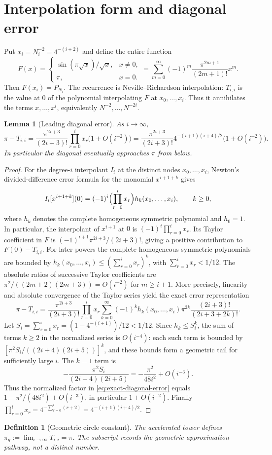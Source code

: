 \documentclass[11pt]{article}
\newtheorem{lemma}{Lemma}
\newtheorem{definition}{Definition}
\begin{document}
\section{Interpolation form and diagonal error}
Put $x_i=N_i^{-2}=4^{-(i+2)}$ and define the entire function
\[
F(x)=\begin{cases}\sin(\pi\sqrt x)/\sqrt x,&x\ne0,\\ \pi,&x=0.\end{cases}
=\sum_{m=0}^{\infty}(-1)^m\frac{\pi^{2m+1}}{(2m+1)!}x^m.
\]
Then $F(x_i)=P_{N_i}$. The recurrence is Neville--Richardson interpolation: $T_{i,i}$ is the value at $0$ of the polynomial interpolating $F$ at $x_0,\ldots,x_i$. Thus it annihilates the terms $x,\ldots,x^i$, equivalently $N^{-2},\ldots,N^{-2i}$.
\begin{lemma}[Leading diagonal error]
As $i\to\infty$,
\[
\pi-T_{i,i}=\frac{\pi^{2i+3}}{(2i+3)!}\prod_{r=0}^{i}x_r\bigl(1+O(i^{-2})\bigr)
=\frac{\pi^{2i+3}}{(2i+3)!}4^{-(i+1)(i+4)/2}\bigl(1+O(i^{-2})\bigr).
\]
In particular the diagonal eventually approaches $\pi$ from below.
\end{lemma}
\begin{proof}
For the degree-$i$ interpolant $I_i$ at the distinct nodes $x_0,\ldots,x_i$, Newton's divided-difference error formula for the monomial $x^{i+1+k}$ gives
\[
I_i[x^{i+1+k}](0)=(-1)^i\Bigl(\prod_{r=0}^i x_r\Bigr)
 h_k(x_0,\ldots,x_i),\qquad k\ge0,
\]
where $h_k$ denotes the complete homogeneous symmetric polynomial and $h_0=1$. In particular, the interpolant of $x^{i+1}$ at $0$ is $(-1)^i\prod_{r=0}^ix_r$. Its Taylor coefficient in $F$ is $(-1)^{i+1}\pi^{2i+3}/(2i+3)!$, giving a positive contribution to $F(0)-T_{i,i}$. For later powers the complete homogeneous symmetric polynomials are bounded by $h_k(x_0,\ldots,x_i)\le(\sum_{r=0}^ix_r)^k$, with $\sum_{r=0}^ix_r<1/12$. The absolute ratios of successive Taylor coefficients are $\pi^2/((2m+2)(2m+3))=O(i^{-2})$ for $m\ge i+1$. More precisely, linearity and absolute convergence of the Taylor series yield the exact error representation
\begin{equation}\label{eq:exact-diagonal-error}
\pi-T_{i,i}=
\frac{\pi^{2i+3}}{(2i+3)!}\prod_{r=0}^ix_r
\sum_{k=0}^{\infty}(-1)^k h_k(x_0,\ldots,x_i)\pi^{2k}
\frac{(2i+3)!}{(2i+3+2k)!}.
\end{equation}
Let $S_i=\sum_{r=0}^ix_r=(1-4^{-(i+1)})/12<1/12$.
Since $h_k\le S_i^k$, the sum of terms $k\ge2$ in the normalized series is $O(i^{-4})$: each such term is bounded by
$[\pi^2S_i/((2i+4)(2i+5))]^k$, and these bounds form a geometric tail for sufficiently large $i$. The $k=1$ term is
\[
-\frac{\pi^2S_i}{(2i+4)(2i+5)}
=-\frac{\pi^2}{48i^2}+O(i^{-3}).
\]
Thus the normalized factor in \eqref{eq:exact-diagonal-error} equals
$1-\pi^2/(48i^2)+O(i^{-3})$, in particular $1+O(i^{-2})$. Finally $\prod_{r=0}^ix_r=4^{-\sum_{r=0}^i(r+2)}=4^{-(i+1)(i+4)/2}$.
\end{proof}
\begin{definition}[Geometric circle constant]
The accelerated tower defines $\pi_g:=\lim_{i\to\infty}T_{i,i}=\pi$. The subscript records the geometric approximation pathway, not a distinct number.
\end{definition}
\end{document}
